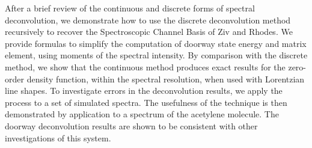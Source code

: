 \documentclass[12pt]{mitthesis}
\begin{document}
After a brief review of the continuous and discrete forms of spectral
deconvolution, we demonstrate how to use the discrete deconvolution
method recursively to recover the Spectroscopic Channel Basis of Ziv
and Rhodes.  We provide formulas to simplify the computation of
doorway state energy and matrix element, using moments of the spectral
intensity.  By comparison with the discrete method, we show that the
continuous method produces exact results for the zero-order density
function, within the spectral resolution, when used with Lorentzian
line shapes.  To investigate errors in the deconvolution results, we
apply the process to a set of simulated spectra.  The usefulness of
the technique is then demonstrated by application to a spectrum of the
acetylene molecule.  The doorway deconvolution results are shown to be
consistent with other investigations of this system.
\end{document}
